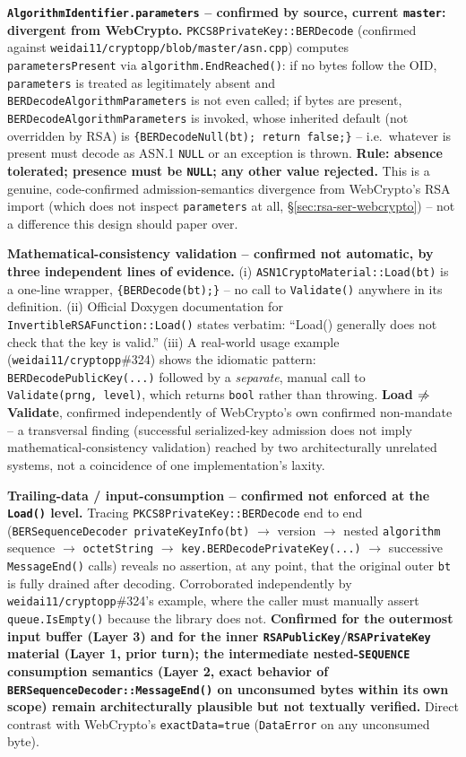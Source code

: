 \documentclass[11pt,a4paper]{article}
\begin{document}
\textbf{\texttt{AlgorithmIdentifier.parameters} -- confirmed by source, current \texttt{master}: divergent from WebCrypto.} \texttt{PKCS8PrivateKey::BERDecode} (confirmed against \texttt{weidai11/cryptopp/blob/master/asn.cpp}) computes \texttt{parametersPresent} via \texttt{algorithm.EndReached()}: if no bytes follow the OID, \texttt{parameters} is treated as legitimately absent and \texttt{BERDecodeAlgorithmParameters} is not even called; if bytes are present, \texttt{BERDecodeAlgorithmParameters} is invoked, whose inherited default (not overridden by RSA) is \texttt{\{BERDecodeNull(bt); return false;\}} -- i.e.\ whatever is present must decode as ASN.1 \texttt{NULL} or an exception is thrown. \textbf{Rule: absence tolerated; presence must be \texttt{NULL}; any other value rejected.} This is a genuine, code-confirmed admission-semantics divergence from WebCrypto's RSA import (which does not inspect \texttt{parameters} at all, \S\ref{sec:rsa-ser-webcrypto}) -- not a difference this design should paper over.

\textbf{Mathematical-consistency validation -- confirmed not automatic, by three independent lines of evidence.} (i) \texttt{ASN1CryptoMaterial::Load(bt)} is a one-line wrapper, \texttt{\{BERDecode(bt);\}} -- no call to \texttt{Validate()} anywhere in its definition. (ii) Official Doxygen documentation for \texttt{InvertibleRSAFunction::Load()} states verbatim: ``Load() generally does not check that the key is valid.'' (iii) A real-world usage example (\texttt{weidai11/cryptopp}\#324) shows the idiomatic pattern: \texttt{BERDecodePublicKey(...)} followed by a \emph{separate}, manual call to \texttt{Validate(prng, level)}, which returns \texttt{bool} rather than throwing. \textbf{Load $\centernot\Rightarrow$ Validate}, confirmed independently of WebCrypto's own confirmed non-mandate -- a transversal finding (successful serialized-key admission does not imply mathematical-consistency validation) reached by two architecturally unrelated systems, not a coincidence of one implementation's laxity.

\textbf{Trailing-data / input-consumption -- confirmed not enforced at the \texttt{Load()} level.} Tracing \texttt{PKCS8PrivateKey::BERDecode} end to end (\texttt{BERSequenceDecoder privateKeyInfo(bt)} $\to$ version $\to$ nested \texttt{algorithm} sequence $\to$ \texttt{octetString} $\to$ \texttt{key.BERDecodePrivateKey(...)} $\to$ successive \texttt{MessageEnd()} calls) reveals no assertion, at any point, that the original outer \texttt{bt} is fully drained after decoding. Corroborated independently by \texttt{weidai11/cryptopp}\#324's example, where the caller must manually assert \texttt{queue.IsEmpty()} because the library does not. \textbf{Confirmed for the outermost input buffer (Layer 3) and for the inner \texttt{RSAPublicKey}/\texttt{RSAPrivateKey} material (Layer 1, prior turn); the intermediate nested-\texttt{SEQUENCE} consumption semantics (Layer 2, exact behavior of \texttt{BERSequenceDecoder::MessageEnd()} on unconsumed bytes within its own scope) remain architecturally plausible but not textually verified.} Direct contrast with WebCrypto's \texttt{exactData=true} (\texttt{DataError} on any unconsumed byte).
\end{document}
